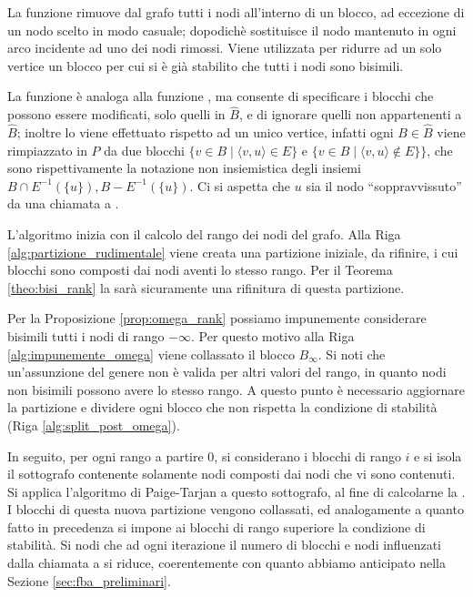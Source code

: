 La funzione  rimuove dal grafo tutti i nodi all'interno di un blocco, ad eccezione di un nodo scelto in modo casuale; dopodichè sostituisce il nodo mantenuto in ogni arco incidente ad uno dei nodi rimossi. Viene utilizzata per ridurre ad un solo vertice un blocco per cui si è già stabilito che tutti i nodi sono bisimili.

La funzione  è analoga alla funzione \splitfunc, ma consente di specificare i blocchi che possono essere modificati, solo quelli in $\widehat{B}$, e di ignorare quelli non appartenenti a $\widehat{B}$; inoltre lo \splitfunc viene effettuato rispetto ad un unico vertice, infatti ogni $B \in \widehat{B}$ viene rimpiazzato in $P$ da due blocchi $\{v \in B \mid \langle v, u\rangle \in E\}$ e $\{v \in B \mid \langle v, u \rangle \not\in E\}\}$, che sono rispettivamente la notazione non insiemistica degli insiemi $B \cap E^{-1}(\{u\}), B - E^{-1}(\{u\})$. Ci si aspetta che $u$ sia il nodo ``soppravvissuto'' da una chiamata a .

L'algoritmo inizia con il calcolo del rango dei nodi del grafo. Alla Riga \ref{alg:partizione_rudimentale} viene creata una partizione iniziale, da rifinire, i cui blocchi sono composti dai nodi aventi lo stesso rango. Per il Teorema \ref{theo:bisi_rank} la \rscp sarà sicuramente una rifinitura di questa partizione.

Per la Proposizione \ref{prop:omega_rank} possiamo impunemente considerare bisimili tutti i nodi di rango $-\infty$. Per questo motivo alla Riga \ref{alg:impunemente_omega} viene collassato il blocco $B_\infty$. Si noti che un'assunzione del genere non è valida per altri valori del rango, in quanto nodi non bisimili possono avere lo stesso rango. A questo punto è necessario aggiornare la partizione e dividere ogni blocco che non rispetta la condizione di stabilità (Riga \ref{alg:split_post_omega}).

In seguito, per ogni rango a partire 0, si considerano i blocchi di rango $i$ e si isola il sottografo contenente solamente nodi composti dai nodi che vi sono contenuti. Si applica l'algoritmo di Paige-Tarjan a questo sottografo, al fine di calcolarne la \rscp. I blocchi di questa nuova partizione vengono collassati, ed analogamente a quanto fatto in precedenza si impone ai blocchi di rango superiore la condizione di stabilità. Si nodi che ad ogni iterazione il numero di blocchi e nodi influenzati dalla chiamata a  si riduce, coerentemente con quanto abbiamo anticipato nella Sezione \ref{sec:fba_preliminari}.

